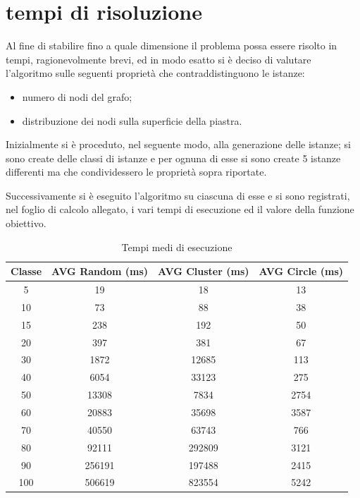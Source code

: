 %
%
\section[Tempi di risoluzione]{tempi di risoluzione}
\label{pt1:time}
Al fine di stabilire fino a quale dimensione il problema possa essere risolto in tempi, ragionevolmente brevi, ed in modo esatto si è deciso di valutare l'algoritmo sulle seguenti proprietà che contraddistinguono le istanze:

\begin{itemize}
\item numero di nodi del grafo;
\item distribuzione dei nodi sulla superficie della piastra.
\end{itemize}

Inizialmente si è proceduto, nel seguente modo, alla generazione delle istanze; si sono create delle classi di istanze e per ognuna di esse si sono create 5 istanze differenti ma che condividessero le proprietà sopra riportate.

Successivamente si è eseguito l'algoritmo su ciascuna di esse e si sono registrati, nel foglio di calcolo allegato, i vari tempi di esecuzione ed il valore della funzione obiettivo.

\begin{table}[htbp]
\centering
\label{pt1:time:tabular}
\begin{tabular}{|c|c|c|c|}
\hline
\textbf{Classe} & \textbf{AVG Random (ms)} & \textbf{AVG Cluster (ms)} & \textbf{AVG Circle (ms)}\\
\hline
5   &     19 &     18 &   13 \\
\hline
10  &     73 &     88 &   38 \\
\hline
15  &    238 &    192 &   50 \\
\hline
20  &    397 &    381 &   67 \\
\hline
30  &   1872 &  12685 &  113 \\
\hline
40  &   6054 &  33123 &  275 \\
\hline
50  &  13308 &   7834 & 2754 \\
\hline
60  &  20883 &  35698 & 3587 \\
\hline
70  &  40550 &  63743 &  766 \\
\hline
80  &  92111 & 292809 & 3121 \\
\hline
90  & 256191 & 197488 & 2415 \\
\hline
100 & 506619 & 823554 & 5242 \\
\hline
\end{tabular}
\caption{Tempi medi di esecuzione}
\end{table}

